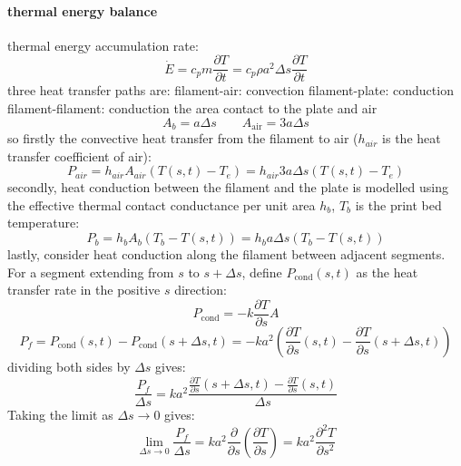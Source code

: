 \documentclass{article}
\begin{document}
\paragraph{thermal energy balance}
thermal energy accumulation rate:
\begin{equation}
\dot{E}
=c_p m \frac{\partial T}{\partial t}
=c_p \rho a^2 \Delta s
 \frac{\partial T}{\partial t}
\label{eq: Edot}
\end{equation}
three heat transfer paths are:
filament-air: convection
filament-plate: conduction
filament-filament: conduction
the area contact to the plate and air
\begin{equation}
A_b=a\Delta s
\qquad
A_{\mathrm{air}}=3a\Delta s
\end{equation}
so firstly the convective heat transfer from the filament to air ($h_{air}$ is the heat transfer coefficient of air):
\begin{equation}
P_{air}
=h_{air} A_{air} (T(s,t)-T_e)
=h_{air} 3a \Delta s (T(s,t)-T_e)
\label{eq: Pair}
\end{equation}
secondly, heat conduction between the filament and the plate is modelled using the effective thermal contact conductance per unit area $h_b$, $T_b$ is the print bed temperature: 
\begin{equation}
P_b
=h_b A_b (T_b-T(s,t))
=h_b a \Delta s (T_b-T(s,t))
\label{eq:Pb}
\end{equation}
lastly, consider heat conduction along the filament between adjacent segments. For a segment extending from $s$ to $s+\Delta s$, define $P_{\mathrm{cond}}(s,t)$ as the heat transfer rate in the positive $s$ direction:
\begin{equation}
P_{\mathrm{cond}}
=- k \frac{\partial T}{\partial s} A
\end{equation}
\begin{equation}
P_f
=P_{\mathrm{cond}}(s,t)-P_{\mathrm{cond}}(s+\Delta s,t)
=-k a^2 (\frac{\partial T}{\partial s} (s,t) -\frac{\partial T}{\partial s}(s+\Delta s,t))
\label{eq: Pcond}
\end{equation}
dividing both sides by $\Delta s$ gives:
\begin{equation}
\frac {P_f}{\Delta s}= k a^2 \frac{\frac{\partial T}{\partial s} (s+\Delta s,t) -\frac{\partial T}{\partial s}(s,t)}{\Delta s}
\end{equation}
Taking the limit as $\Delta s\to 0$ gives:
\begin{equation}
\lim_{\Delta s \to 0}\frac{P_f}{\Delta s}= ka^2
\frac{\partial}{\partial s}
\left(\frac{\partial T}{\partial s}\right)
=ka^2\frac{\partial^2 T}{\partial s^2}
\end{equation}
\end{document}
